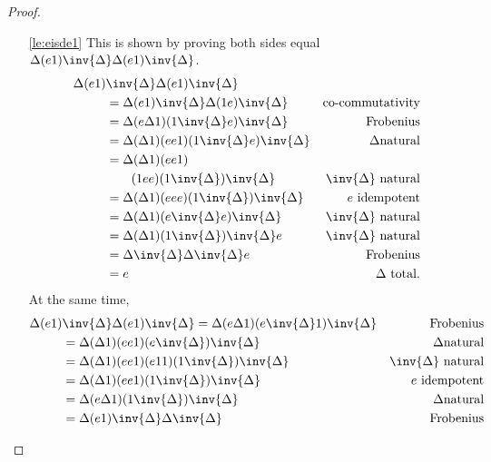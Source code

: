 \begin{proof}
  \prepprooflist
  \begin{enumerate}[{(}i{)}]
    \item[\ref{le:eisde1}]This is shown by proving both sides
      equal $\Delta (e\* 1) \inv{\Delta} \Delta (e\* 1) \inv{\Delta}$.
      \begin{align*}
        \Delta (e\* 1) &\inv{\Delta} \Delta (e\* 1) \inv{\Delta} \\
        &= \Delta (e\* 1) \inv{\Delta} \Delta (1\* e) \inv{\Delta}&\text{co-commutativity}\\
        &=\Delta(e \Delta \* 1) (1\*\inv{\Delta} e) \inv{\Delta} &\text{Frobenius}\\
        &=\Delta(\Delta \* 1) (e\*e\*1) (1\*\inv{\Delta}e)\inv{\Delta}&\Delta\text{natural}\\
        &=\Delta(\Delta \* 1) (e\*e\*1) \\
          & \qquad(1\*e\*e)(1\*\inv{\Delta})\inv{\Delta}&\inv{\Delta}\text{ natural}\\
        &=\Delta (\Delta \*1) (e\* e\* e)(1\* \inv{\Delta})\inv{\Delta}&e\text{ idempotent}\\
        &=\Delta (\Delta \*1) (e\* \inv{\Delta}e)\inv{\Delta}&\inv{\Delta}\text{ natural}\\
        &=\Delta (\Delta \*1) (1\* \inv{\Delta})\inv{\Delta}e&\inv{\Delta}\text{ natural}\\
        &=\Delta \inv{\Delta}\Delta \inv{\Delta}e&\text{Frobenius}\\
        &=e&\Delta\text{ total}.
      \end{align*}
      At the same time,
      \begin{align*}
        \Delta (e\* 1) &\inv{\Delta} \Delta (e\* 1) \inv{\Delta}
        =\Delta(e \Delta \* 1) (e\*\inv{\Delta} 1) \inv{\Delta} &\text{Frobenius}\\
        &=\Delta(\Delta \* 1) (e\*e\*1) (e\*\inv{\Delta})\inv{\Delta}&\Delta\text{natural}\\
        &=\Delta(\Delta \* 1) (e\*e\*1) (e\*1\*1)(1\*\inv{\Delta})\inv{\Delta}&\inv{\Delta}\text{ natural}\\
        &=\Delta (\Delta \*1) (e\* e\* 1)(1\* \inv{\Delta})\inv{\Delta}&e\text{ idempotent}\\
        &=\Delta  (e\Delta\* 1)(1\*\inv{\Delta})\inv{\Delta}&\Delta\text{natural}\\
        &=\Delta (e \* 1) \inv{\Delta}\Delta\inv{\Delta} &\text{Frobenius}\\

\end{align*}
\end{enumerate}
\end{proof}
